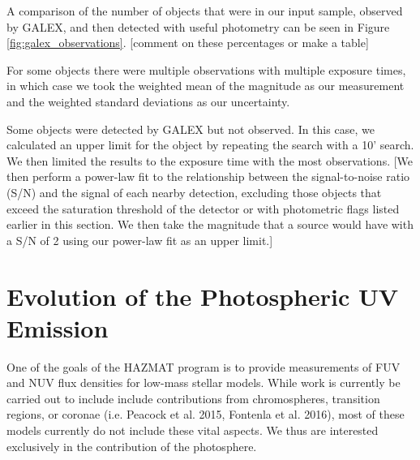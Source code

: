 \documentclass[twocolumn]{aastex62}
\begin{document}
A comparison of the number of objects that were in our input sample, observed by GALEX, and then detected with useful photometry can be seen in Figure \ref{fig:galex_observations}. [comment on these percentages or make a table]

For some objects there were multiple observations with multiple exposure times, in which case we took the weighted mean of the magnitude as our measurement and the weighted standard deviations as our uncertainty.

Some objects were detected by GALEX but not observed. In this case, we calculated an upper limit for the object by repeating the search with a 10' search. We then limited the results to the exposure time with the most observations. [We then perform a power-law fit to the relationship between the signal-to-noise ratio (S/N) and the signal of each nearby detection, excluding those objects that exceed the saturation threshold of the detector or with photometric flags listed earlier in this section. We then take the magnitude that a source would have with a S/N of 2 using our power-law fit as an upper limit.]




\section{Evolution of the Photospheric UV Emission}

One of the goals of the HAZMAT program is to provide measurements of FUV and NUV flux densities for low-mass stellar models. While work is currently be carried out to include include contributions from chromospheres, transition regions, or coronae (i.e. Peacock et al. 2015, Fontenla et al. 2016), most of these models currently do not include these vital aspects. We thus are interested exclusively in the contribution of the photosphere. 
\end{document}

